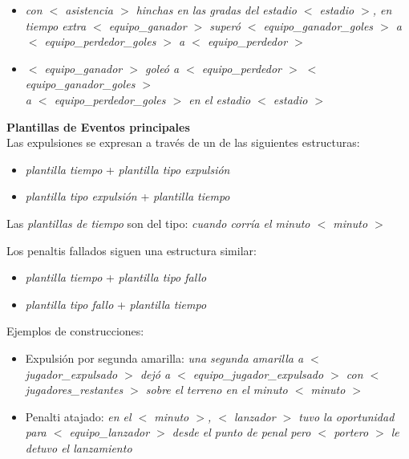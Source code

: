         \begin{itemize}
           \item  \textit{ con  $<$ asistencia $>$ hinchas en las gradas del estadio $<$ estadio $>$, en tiempo extra $<$ equipo\_ganador $>$ superó $<$ equipo\_ganador\_goles $>$ a \\$<$ equipo\_perdedor\_goles $>$ a $<$ equipo\_perdedor $>$ }
        
            \item  \textit{$<$ equipo\_ganador $>$ goleó a $<$ equipo\_perdedor $>$ $<$ equipo\_ganador\_goles $>$ \\a $<$ equipo\_perdedor\_goles $>$ en el estadio $<$ estadio $>$}
        \end{itemize}


\textbf{Plantillas de Eventos principales}\\


    Las expulsiones se expresan a través de un de las siguientes estructuras:
    \begin{itemize}
        \item \textit{plantilla tiempo} + \textit{plantilla tipo expulsión}
        \item \textit{plantilla tipo expulsión} + \textit{plantilla tiempo}
    \end{itemize}

    Las \textit{plantillas de tiempo} son del tipo: \textit{cuando corría el minuto $<$ minuto $>$}

    Los penaltis fallados siguen una estructura similar:
    \begin{itemize}
        \item \textit{plantilla tiempo} + \textit{plantilla tipo fallo}
        \item \textit{plantilla tipo fallo} + \textit{plantilla tiempo}
    \end{itemize}

    Ejemplos de construcciones: 

    \begin{itemize}
    \item Expulsión por segunda amarilla:  \textit{una segunda amarilla a $<$ jugador\_expulsado $>$ dejó 
    a $<$ equipo\_jugador\_expulsado $>$ con $<$ jugadores\_restantes $>$ sobre el terreno 
    en el minuto $<$ minuto $>$}
    
    \item Penalti atajado: \textit{en el $<$ minuto $>$, $<$ lanzador $>$ tuvo la oportunidad 
    para $<$ equipo\_lanzador $>$ desde el punto de penal pero $<$ portero $>$ le detuvo el lanzamiento}
    \end{itemize}


